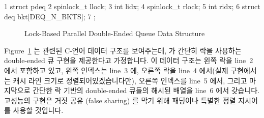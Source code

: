 { \scriptsize
\begin{verbbox}
  1 struct pdeq {
  2   spinlock_t llock;
  3   int lidx;
  4   spinlock_t rlock;
  5   int ridx;
  6   struct deq bkt[DEQ_N_BKTS];
  7 };
\end{verbbox}
}
\begin{figure}[tbp]
\centering
\theverbbox
\caption{Lock-Based Parallel Double-Ended Queue Data Structure}
\label{fig:SMPdesign:Lock-Based Parallel Double-Ended Queue Data Structure}
\end{figure}

Figure~\ref{fig:SMPdesign:Lock-Based Parallel Double-Ended Queue Data Structure}
는 관련된 C-언어 데이터 구조를 보여주는데,  가 간단히 락을
사용하는 double-ended 큐 구현을 제공한다고 가정합니다.
이 데이터 구조는 왼쪽 락을 line~2 에서 포함하고 있고, 왼쪽 인덱스는 line~3 에,
오른쪽 락을 line~4 에서(실제 구현에서는 캐시 라인 크기로 정렬되어있겠습니다만),
오른쪽 인덱스를 line~5 에서, 그리고 마지막으로 간단한 락 기반의 double-ended
큐들의 해시된 배열을 line~6 에서 갖습니다.
고성능의 구현은 거짓 공유 (false sharing) 를 막기 위해 패딩이나 특별한 정렬
지시어를 사용할 것입니다.

